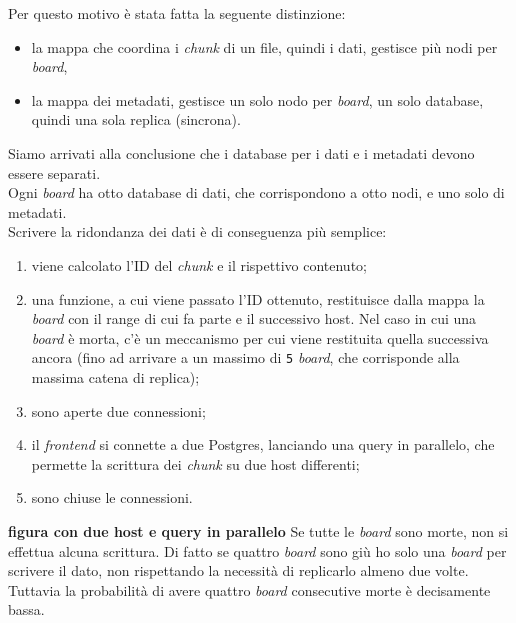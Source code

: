 Per questo motivo \`{e} stata fatta la seguente distinzione:
\begin{itemize}
\item 
la mappa che coordina i \textit{chunk} di un file, quindi i dati, gestisce pi\`{u} nodi per \textit{board},
\item
la mappa dei metadati, gestisce un solo nodo per \textit{board}, un solo database, quindi una sola replica (sincrona).
\end{itemize}
Siamo arrivati alla conclusione che i database per i dati e i metadati devono essere separati.\\
Ogni \textit{board} ha otto database di dati, che corrispondono a otto nodi, e uno solo di metadati.\\
Scrivere la ridondanza dei dati \`{e} di conseguenza pi\`{u} semplice: 
\begin{enumerate}
\item
viene calcolato l'ID del \textit{chunk} e il rispettivo contenuto;
\item
una funzione, a cui viene passato l'ID ottenuto, restituisce dalla mappa la \textit{board} con il range di cui fa parte e il successivo host. Nel caso in cui una \textit{board} \`{e} morta, c'\`{e} un meccanismo per cui viene restituita quella successiva ancora (fino ad arrivare a un massimo di \verb"5" \textit{board}, che corrisponde alla massima catena di replica); 
\item 
sono aperte due connessioni;
\item
il \textit{frontend} si connette a due Postgres, lanciando una query in parallelo, che permette la scrittura dei \textit{chunk} su due host differenti;
\item
sono chiuse le connessioni.
\end{enumerate}
\textbf{figura con due host e query in parallelo}
Se tutte le \textit{board} sono morte, non si effettua alcuna scrittura. Di fatto se quattro \textit{board} sono gi\`{u} ho solo una \textit{board} per scrivere il dato, non rispettando la necessit\`{a} di replicarlo almeno due volte.\\
Tuttavia la probabilit\`{a} di avere quattro \textit{board} consecutive morte \`{e} decisamente bassa.\\

